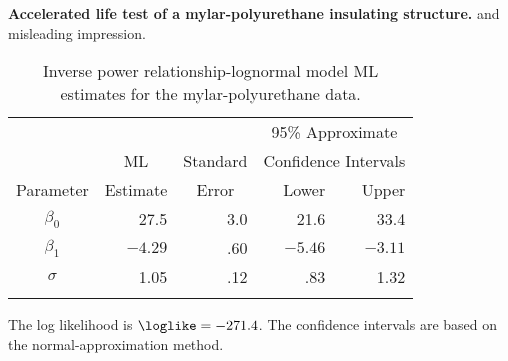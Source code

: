 \begin{example}{\bf Accelerated life test of a mylar-polyurethane insulating 
structure.}
and misleading impression.
\begin{table}
\caption{Inverse power relationship-lognormal model ML estimates for the
mylar-polyurethane data.}
\centering\small
\begin{tabular}{crrrr}
\\[-.5ex] \hline
 & & & \multicolumn{2}{c}{95\% Approximate}\\
&\multicolumn{1}{c}{ML} &Standard  & \multicolumn{2}{c}{Confidence
Intervals}\\  \cline{4-5}
Parameter &  Estimate & \multicolumn{1}{c}{Error} & Lower & Upper \\
\hline 
 $\beta_{0} $ & 27.5 & 3.0 &21.6 &33.4 \\[.7ex] 
$\beta_{1}$ & $-4.29$ & .60 & $-5.46$ & $-3.11$ \\[.7ex] 
$\sigma$ & 1.05 & .12 & .83 & 1.32 \\
\hline
\\[-1.8ex]
\end{tabular}
\begin{minipage}[t]{4in}
The log likelihood is $\loglike= -271.4$. The confidence intervals 
are based on the normal-approximation method.
\end{minipage}
\label{table:mylar.lognor.mles}
\end{table}
\end{example}
